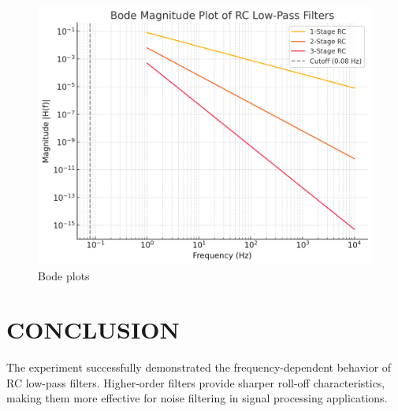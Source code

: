 \documentclass[a4paper,12pt]{article}
\begin{document}
\begin{figure}[h]
    \begin{minipage}{0.3\textwidth}
        \centering
        \includegraphics[width=\textwidth]{fig/plot.jpg}
    \end{minipage}

    \caption{Bode plots}
    \label{fig:13images}
\end{figure}



\section{\textcolor{myred}{CONCLUSION}}
The experiment successfully demonstrated the frequency-dependent behavior of RC low-pass filters. Higher-order filters provide sharper roll-off characteristics, making them more effective for noise filtering in signal processing applications.
\end{document}
